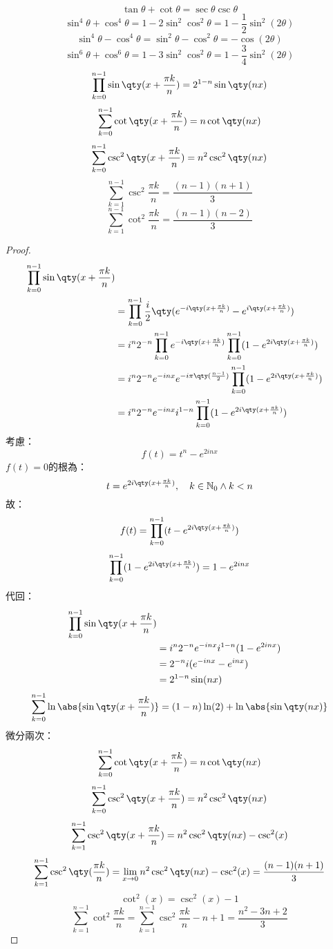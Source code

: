 \documentclass[a4paper,12pt]{report}
\begin{document}
\[\tan\theta+\cot\theta=\sec\theta\csc\theta\]
\[\sin^4\theta +\cos^4\theta = 1-2\sin^2\cos^2\theta=1-\frac{1}{2}\sin^2(2\theta)\]
\[\sin^4\theta -\cos^4\theta = \sin^2\theta -\cos^2\theta=-\cos(2\theta)\]
\[\sin^6\theta +\cos^6\theta = 1-3\sin^2\cos^2\theta=1-\frac{3}{4}\sin^2(2\theta)\]
\[\prod_{k=0}^{n-1}\sin\qty(x+\frac{\pi k}{n})=2^{1-n}\sin\qty(nx)\]
\[\sum_{k=0}^{n-1}\cot\qty(x+\frac{\pi k}{n})=n\cot\qty(nx)\]
\[\sum_{k=0}^{n-1}\csc^2\qty(x+\frac{\pi k}{n})=n^2\csc^2\qty(nx)\]
\[\sum_{k=1}^{n-1}\csc^2\frac{\pi k}{n}=\frac{(n-1)(n+1)}{3}\]
\[\sum_{k=1}^{n-1}\cot^2\frac{\pi k}{n}=\frac{(n-1)(n-2)}{3}\]
\begin{proof}
\[\begin{aligned}
\prod_{k=0}^{n-1}\sin\qty(x+\frac{\pi k}{n})\\
&=\prod_{k=0}^{n-1}\frac{i}{2}\qty(e^{-i\qty(x+\frac{\pi k}{n})}-e^{i\qty(x+\frac{\pi k}{n})})\\
&=i^n2^{-n}\prod_{k=0}^{n-1}e^{-i\qty(x+\frac{\pi k}{n})}\prod_{k=0}^{n-1}(1-e^{2i\qty(x+\frac{\pi k}{n})})\\
&=i^n2^{-n}e^{-inx}e^{-i\pi\qty(\frac{n-1}{2})}
\prod_{k=0}^{n-1}(1-e^{2i\qty(x+\frac{\pi k}{n})})\\
&=i^n2^{-n}e^{-inx}i^{1-n}\prod_{k=0}^{n-1}(1-e^{2i\qty(x+\frac{\pi k}{n})})
\end{aligned}\]
考慮：
\[f(t)=t^n-e^{2inx}\]
$f(t)=0$的根為：
\[t=e^{2i\qty(x+\frac{\pi k}{n})},\quad k\in\mathbb{N}_0\land k<n\]
故：
\[f(t)=\prod_{k=0}^{n-1}(t-e^{2i\qty(x+\frac{\pi k}{n})})\]
\[\prod_{k=0}^{n-1}(1-e^{2i\qty(x+\frac{\pi k}{n})})=1-e^{2inx}\]
代回：
\[\begin{aligned}
\prod_{k=0}^{n-1}\sin\qty(x+\frac{\pi k}{n})\\
&=i^n2^{-n}e^{-inx}i^{1-n}(1-e^{2inx})\\
&=2^{-n}i(e^{-inx}-e^{inx})\\
&=2^{1-n}\sin(nx)
\end{aligned}\]
\[\sum_{k=0}^{n-1}\ln\abs{\sin\qty(x+\frac{\pi k}{n})}=(1-n)\ln(2)+\ln\abs{\sin\qty(nx)}\]
微分兩次：
\[\sum_{k=0}^{n-1}\cot\qty(x+\frac{\pi k}{n})=n\cot\qty(nx)\]
\[\sum_{k=0}^{n-1}\csc^2\qty(x+\frac{\pi k}{n})=n^2\csc^2\qty(nx)\]
\[\sum_{k=1}^{n-1}\csc^2\qty(x+\frac{\pi k}{n})=n^2\csc^2\qty(nx)-\csc^2(x)\]
\[\sum_{k=1}^{n-1}\csc^2\qty(\frac{\pi k}{n})=\lim_{x\to 0}n^2\csc^2\qty(nx)-\csc^2(x)=\frac{(n-1)(n+1)}{3}\]
\[\cot^2(x)=\csc^2(x)-1\]
\[\sum_{k=1}^{n-1}\cot^2\frac{\pi k}{n}=\sum_{k=1}^{n-1}\csc^2\frac{\pi k}{n}-n+1=\frac{n^2-3n+2}{3}\]
\end{proof}
\end{document}

